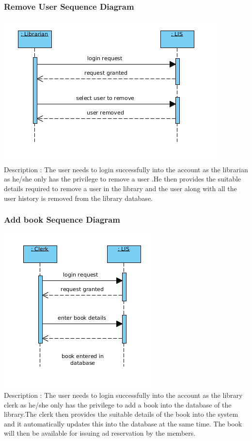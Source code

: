 \documentclass[a4paper]{article}
\begin{document}
\subsubsection*{Remove User Sequence Diagram}
\includegraphics[scale=0.50]{images/seqDiagRemoveUser.png}
\\
Description : The user needs to login successfully into the account as the librarian as he/she only has the privilege to remove a user .He then provides the suitable details required to remove a user in the library and the user along with all the user history is removed from the library database.
\\

\subsubsection*{Add book Sequence Diagram}
\includegraphics[scale=0.50]{images/seqDiagAddBook.png}
\\
Description : The user needs to login successfully into the account as the library clerk as he/she only has the privilege to add a book into the database of the library.The clerk then provides the suitable details of the book into the system and it automatically updates this into the database at the same time. The book will then be available for issuing ad reservation by the members.
\\
\end{document}
